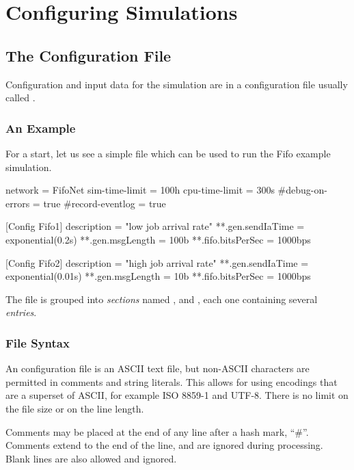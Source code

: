 \chapter{Configuring Simulations}
\label{cha:config-sim}

\section{The Configuration File}

Configuration and input data for the simulation are in
a configuration file usually called .

\subsection{An Example}

For a start, let us see a simple  file which
can be used to run the Fifo example simulation.

\begin{inifile}
[General]
network = FifoNet
sim-time-limit = 100h
cpu-time-limit = 300s
#debug-on-errors = true
#record-eventlog = true

[Config Fifo1]
description = "low job arrival rate"
**.gen.sendIaTime = exponential(0.2s)
**.gen.msgLength = 100b
**.fifo.bitsPerSec = 1000bps

[Config Fifo2]
description = "high job arrival rate"
**.gen.sendIaTime = exponential(0.01s)
**.gen.msgLength = 10b
**.fifo.bitsPerSec = 1000bps
\end{inifile}

The file is grouped into \textit{sections} named \ttt{[General]}, 
and , each one containing several \textit{entries}.


\subsection{File Syntax}

An {\opp} configuration file is an ASCII text file, but non-ASCII
characters are permitted in comments and string literals. This allows for
using encodings that are a superset of ASCII, for example ISO 8859-1 and
UTF-8. There is no limit on the file size or on the line length.

Comments may be placed at the end of any line after a hash mark, ``\#''.
Comments extend to the end of the line, and are ignored during processing.
Blank lines are also allowed and ignored.

